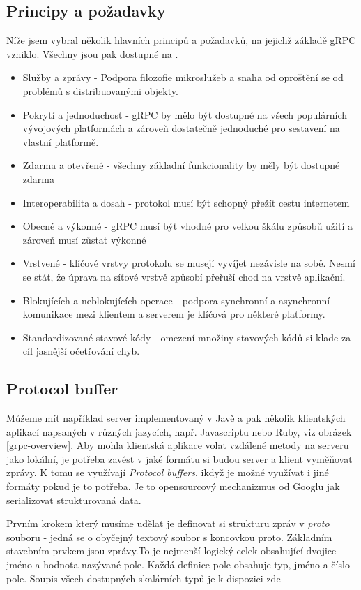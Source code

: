 \documentclass[thesis=M,czech]{FITthesis}[2019/12/23]
\begin{document}
\subsection{Principy a požadavky}
Níže jsem vybral několik hlavních principů a požadavků, na jejichž základě gRPC vzniklo. Všechny jsou pak dostupné na \cite{grpc_requirements}.
\begin{itemize}
    \item Služby a zprávy - Podpora filozofie mikroslužeb a snaha od oproštění se od problémů s distribuovanými objekty.
    \item Pokrytí a jednoduchost - gRPC by mělo být dostupné na všech populárních vývojových platformách a zároveň dostatečně jednoduché pro sestavení na vlastní platformě.
    \item Zdarma a otevřené - všechny základní funkcionality by měly být dostupné zdarma
    \item Interoperabilita a dosah - protokol musí být schopný přežít cestu internetem
    \item Obecné a výkonné - gRPC musí být vhodné pro velkou škálu způsobů užití a zároveň musí zůstat výkonné
    \item Vrstvené - klíčové vrstvy protokolu se musejí vyvíjet nezávisle na sobě. Nesmí se stát, že úprava na síťové vrstvě způsobí přeřuší chod na vrstvě aplikační.
    \item Blokujících a neblokujících operace - podpora synchronní a asynchronní komunikace mezi klientem a serverem je klíčová pro některé platformy.
    \item Standardizované stavové kódy - omezení množiny stavových kódů si klade za cíl jasnější očetřování chyb.
\end{itemize}

\subsection{Protocol buffer}
Můžeme mít například server implementovaný v Javě a pak několik klientských aplikací napsaných v různých jazycích, např. Javascriptu nebo Ruby, viz obrázek \ref{grpc-overview}. Aby mohla klientská aplikace volat vzdálené metody na serveru jako lokální, je potřeba zavést v jaké formátu si budou server a klient vyměňovat zprávy. K tomu se využívají \textit{Protocol buffers}, ikdyž je možné využívat i jiné formáty pokud je to potřeba. Je to opensourcový mechanizmus od Googlu jak serializovat strukturovaná data.

Prvním krokem který musíme udělat je definovat si strukturu zpráv v \textit{proto} souboru - jedná se o obyčejný textový soubor s  koncovkou proto. Základním stavebním prvkem jsou zprávy.To je nejmenší logický celek obsahující dvojice jméno a hodnota nazývané pole. Každá definice pole obsahuje typ, jméno a číslo pole. Soupis všech dostupných skalárních typů je k dispozici zde \cite{proto_scalars}
\end{document}
